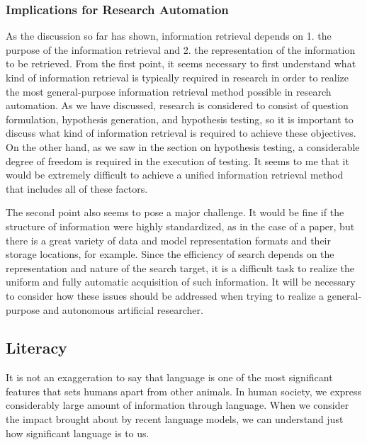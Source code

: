 \subsubsection{Implications for Research Automation}
As the discussion so far has shown, information retrieval depends on 1. the purpose of the information retrieval and 2. the representation of the information to be retrieved. From the first point, it seems necessary to first understand what kind of information retrieval is typically required in research in order to realize the most general-purpose information retrieval method possible in research automation. As we have discussed, research is considered to consist of question formulation, hypothesis generation, and hypothesis testing, so it is important to discuss what kind of information retrieval is required to achieve these objectives. On the other hand, as we saw in the section on hypothesis testing, a considerable degree of freedom is required in the execution of testing. It seems to me that it would be extremely difficult to achieve a unified information retrieval method that includes all of these factors.

The second point also seems to pose a major challenge. It would be fine if the structure of information were highly standardized, as in the case of a paper, but there is a great variety of data and model representation formats and their storage locations, for example. Since the efficiency of search depends on the representation and nature of the search target, it is a difficult task to realize the uniform and fully automatic acquisition of such information. It will be necessary to consider how these issues should be addressed when trying to realize a general-purpose and autonomous artificial researcher.



\subsection{Literacy}

It is not an exaggeration to say that language is one of the most significant features that sets humans apart from other animals. In human society, we express considerably large amount of information through language. When we consider the impact brought about by recent language models, we can understand just how significant language is to us.

